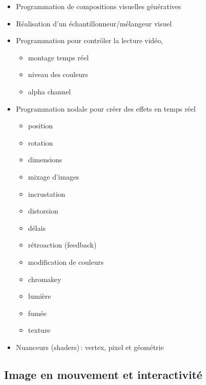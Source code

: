 \documentclass[
  french,
]{book}
\providecommand{\tightlist}{%
  \setlength{\itemsep}{0pt}\setlength{\parskip}{0pt}}
\begin{document}
\begin{itemize}
\tightlist
\item
  Programmation de compositions visuelles génératives
\item
  Réalisation d'un échantillonneur/mélangeur visuel
\item
  Programmation pour contrôler la lecture vidéo,

  \begin{itemize}
  \tightlist
  \item
    montage temps réel
  \item
    niveau des couleurs
  \item
    alpha channel\\
  \end{itemize}
\item
  Programmation nodale pour créer des effets en temps réel

  \begin{itemize}
  \tightlist
  \item
    position
  \item
    rotation
  \item
    dimensions
  \item
    mixage d'images
  \item
    incrustation
  \item
    distorsion
  \item
    délais
  \item
    rétroaction (feedback)
  \item
    modification de couleurs
  \item
    chromakey
  \item
    lumière
  \item
    fumée
  \item
    texture
  \end{itemize}
\item
  Nuanceurs (shaders)\,: vertex, pixel et géométrie
\end{itemize}

\hypertarget{image-en-mouvement-et-interactivituxe9}{%
\subsection{Image en mouvement et interactivité}\label{image-en-mouvement-et-interactivituxe9}}
\end{document}
